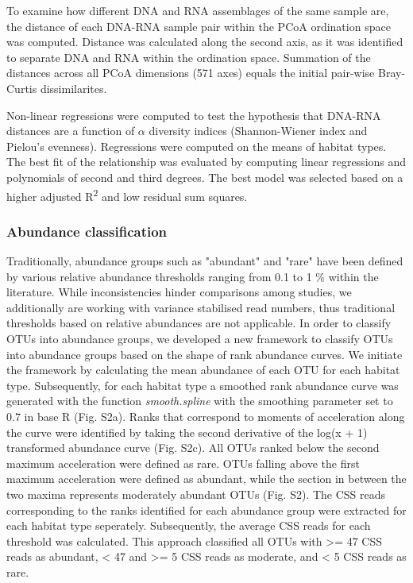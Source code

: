 \documentclass[12pt,a4paper]{article} %
\begin{document}
To examine how different DNA and RNA assemblages of the same sample are, the distance of each DNA-RNA sample pair within the PCoA ordination space was computed. Distance was calculated along the second axis, as it was identified to separate DNA and RNA within the ordination space. Summation of the distances across all PCoA dimensions (571 axes) equals the initial pair-wise Bray-Curtis dissimilarites. 

Non-linear regressions were computed to test the hypothesis that DNA-RNA distances are a function of $\alpha$ diversity indices (Shannon-Wiener index and Pielou's evenness). Regressions were computed on the means of habitat types. The best fit of the relationship was evaluated by computing linear regressions and polynomials of second and third degrees. The best model was selected based on a higher adjusted R\textsuperscript{2} and low residual sum squares.

\subsubsection*{Abundance classification}
Traditionally, abundance groups such as "abundant" and "rare" have been defined by various relative abundance thresholds ranging from 0.1 to 1 \% within the literature. While inconsistencies hinder comparisons among studies, we additionally are working with variance stabilised read numbers, thus traditional thresholds based on relative abundances are not applicable. In order to classify OTUs into abundance groups, we developed a new framework to classify OTUs into abundance groups based on the shape of rank abundance curves. We initiate the framework by calculating the mean abundance of each OTU for each habitat type. Subsequently, for each habitat type a smoothed rank abundance curve was generated with the function \textit{smooth.spline} with the smoothing parameter set to 0.7 in base R (Fig. S2a). Ranks that correspond to moments of acceleration along the curve were identified by taking the second derivative of the log(x + 1) transformed abundance curve (Fig. S2c). All OTUs ranked below the second maximum acceleration were defined as rare. OTUs falling above the first maximum acceleration were defined as abundant, while the section in between the two maxima represents moderately abundant OTUs (Fig. S2). The CSS reads corresponding to the ranks identified for each abundance group were extracted for each habitat type seperately. Subsequently, the average CSS reads for each threshold was calculated. This approach classified all OTUs with >= 47 CSS reads as abundant, < 47 and >= 5 CSS reads as moderate, and < 5 CSS reads as rare.
\end{document}
